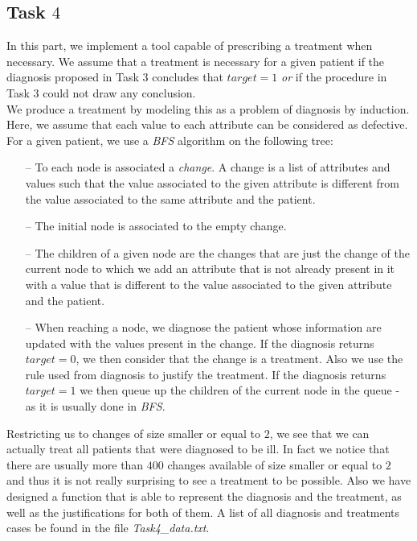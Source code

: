 \documentclass[9pt]{extarticle}
\begin{document}
\subsection{Task $4$}
	In this part, we implement a tool capable of prescribing a treatment when necessary. We assume that a treatment is necessary for a given patient if the diagnosis proposed in Task $3$ concludes that $target=1$ \emph{or} if the procedure in Task $3$ could not draw any conclusion.\\
	We produce a treatment by modeling this as a problem of diagnosis by induction. Here, we assume that each value to each attribute can be considered as defective. For a given patient, we use a \emph{BFS} algorithm on the following tree:
	\begin{itemize}[topsep=0pt,itemsep=0pt,partopsep=0pt, parsep=0pt]
		\item[--] To each node is associated a \emph{change}. A change is a list of attributes and values such that the value associated to the given attribute is different from the value associated to the same attribute and the patient.
		\item[--] The initial node is associated to the empty change.
		\item[--] The children of a given node are the changes that are just the change of the current node to which we add an attribute that is not already present in it with a value that is different to the value associated to the given attribute and the patient.
		\item[--] When reaching a node, we diagnose the patient whose information are updated with the values present in the change. If the diagnosis returns $target=0$, we then consider that the change is a treatment. Also we use the rule used from diagnosis to justify the treatment. If the diagnosis returns $target=1$ we then queue up the children of the current node in the queue - as it is usually done in \emph{BFS}.
	\end{itemize}
Restricting us to changes of size smaller or equal to $2$, we see that we can actually treat all patients that were diagnosed to be ill. In fact we notice that there are usually more than $400$ changes available of size smaller or equal to $2$ and thus it is not really surprising to see a treatment to be possible. Also we have designed a function that is able to represent the diagnosis and the treatment, as well as the justifications for both of them. A list of all diagnosis and treatments cases be found in the file \emph{Task4\_data.txt}.
\end{document}
